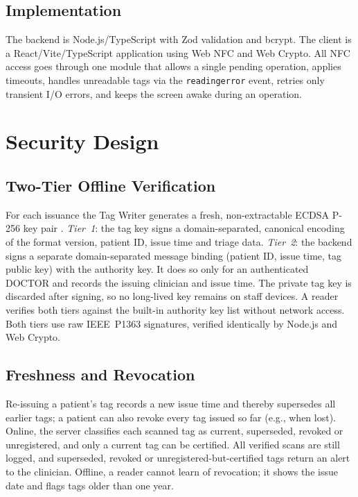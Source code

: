 \documentclass[conference]{IEEEtran}
\begin{document}
\subsection{Implementation}
The backend is Node.js/TypeScript with Zod validation and bcrypt. The client is a React/Vite/TypeScript application using Web NFC and Web Crypto. All NFC access goes through one module that allows a single pending operation, applies timeouts, handles unreadable tags via the \texttt{readingerror} event, retries only transient I/O errors, and keeps the screen awake during an operation.

\section{Security Design}
\label{sec:security}

\subsection{Two-Tier Offline Verification}
For each issuance the Tag Writer generates a fresh, non-extractable ECDSA P-256 key pair \cite{johnson2001}. \textit{Tier~1}: the tag key signs a domain-separated, canonical encoding of the format version, patient ID, issue time and triage data. \textit{Tier~2}: the backend signs a separate domain-separated message binding (patient ID, issue time, tag public key) with the authority key. It does so only for an authenticated DOCTOR and records the issuing clinician and issue time. The private tag key is discarded after signing, so no long-lived key remains on staff devices. A reader verifies both tiers against the built-in authority key list without network access. Both tiers use raw IEEE~P1363 signatures, verified identically by Node.js and Web Crypto.

\subsection{Freshness and Revocation}
Re-issuing a patient's tag records a new issue time and thereby supersedes all earlier tags; a patient can also revoke every tag issued so far (e.g., when lost). Online, the server classifies each scanned tag as current, superseded, revoked or unregistered, and only a current tag can be certified. All verified scans are still logged, and superseded, revoked or unregistered-but-certified tags return an alert to the clinician. Offline, a reader cannot learn of revocation; it shows the issue date and flags tags older than one year.
\end{document}

